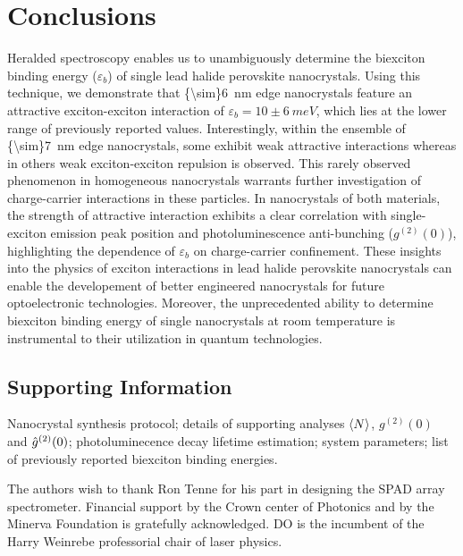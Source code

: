 \documentclass[journal=nalefd, manuscript=letter, layout=twocolumn]{achemso}
\begin{document}
\section*{Conclusions}
Heralded spectroscopy enables us to unambiguously determine the biexciton binding energy ($\varepsilon_b$) of single lead halide perovskite nanocrystals. Using this technique, we demonstrate that \SI{{\sim}6}{nm} edge  nanocrystals feature an attractive exciton-exciton interaction of $\varepsilon_b=10\pm\SI{6}{meV}$, which lies at the lower range of previously reported values. Interestingly, within the ensemble of \SI{{\sim}7}{nm} edge   nanocrystals, some exhibit weak attractive interactions whereas in others weak exciton-exciton repulsion is observed. This rarely observed phenomenon in homogeneous nanocrystals warrants further investigation of charge-carrier interactions in these particles. In nanocrystals of both materials, the strength of attractive interaction exhibits a clear correlation with single-exciton emission peak position and photoluminescence anti-bunching ($g^{(2)}(0)$), highlighting the dependence of $\varepsilon_b$ on charge-carrier confinement. These insights into the physics of exciton interactions in lead halide perovskite nanocrystals can enable the developement of better engineered nanocrystals for future optoelectronic technologies. Moreover, the unprecedented ability to determine biexciton binding energy of single nanocrystals at room temperature is instrumental to their utilization in quantum technologies.


\subsection*{Supporting Information}
Nanocrystal synthesis protocol; details of supporting analyses $\ev{N}$, $g^{(2)}(0)$ and $\Hat{g}^{(2)}(0)$; photoluminecence decay lifetime estimation; system parameters; list of previously reported biexciton binding energies.

\begin{acknowledgement}
The authors wish to thank Ron Tenne for his part in designing the SPAD array spectrometer. Financial support by the Crown center of Photonics and by the Minerva Foundation is gratefully acknowledged. DO is the incumbent of the Harry Weinrebe professorial chair of laser physics.
\end{acknowledgement}


\end{document}
